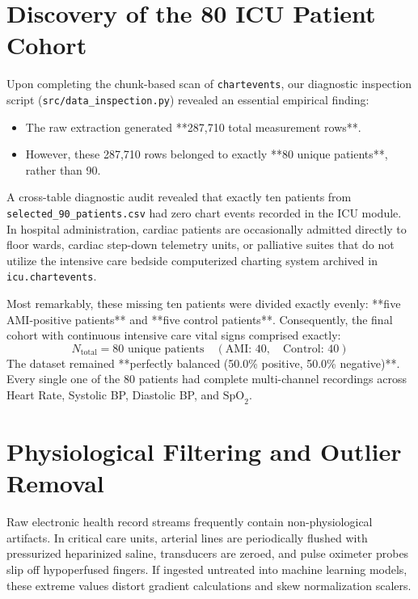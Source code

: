 \section{Discovery of the 80 ICU Patient Cohort}
\label{sec:discovery_80_patients}

Upon completing the chunk-based scan of \texttt{chartevents}, our diagnostic inspection script (\texttt{src/data\_inspection.py}) revealed an essential empirical finding:
\begin{itemize}
    \item The raw extraction generated **287,710 total measurement rows**.
    \item However, these 287,710 rows belonged to exactly **80 unique patients**, rather than 90.
\end{itemize}

A cross-table diagnostic audit revealed that exactly ten patients from \texttt{selected\_90\_patients.csv} had zero chart events recorded in the ICU module. In hospital administration, cardiac patients are occasionally admitted directly to floor wards, cardiac step-down telemetry units, or palliative suites that do not utilize the intensive care bedside computerized charting system archived in \texttt{icu.chartevents}. 

Most remarkably, these missing ten patients were divided exactly evenly: **five AMI-positive patients** and **five control patients**. Consequently, the final cohort with continuous intensive care vital signs comprised exactly:
\begin{equation}
N_{\text{total}} = 80 \text{ unique patients} \quad (\text{AMI: } 40, \quad \text{Control: } 40)
\end{equation}
The dataset remained **perfectly balanced (50.0\% positive, 50.0\% negative)**. Every single one of the 80 patients had complete multi-channel recordings across Heart Rate, Systolic BP, Diastolic BP, and $\text{SpO}_2$.

\section{Physiological Filtering and Outlier Removal}
\label{sec:physio_filtering}

Raw electronic health record streams frequently contain non-physiological artifacts. In critical care units, arterial lines are periodically flushed with pressurized heparinized saline, transducers are zeroed, and pulse oximeter probes slip off hypoperfused fingers. If ingested untreated into machine learning models, these extreme values distort gradient calculations and skew normalization scalers.


